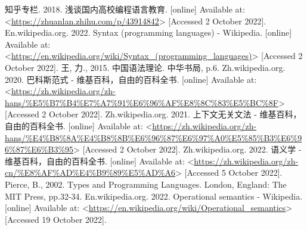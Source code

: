 \documentclass[../main.tex]{subfiles}
\begin{document}
  \begin{thebibliography}{8}
     知乎专栏. 2018. 浅谈国内高校编程语言教育. [online] Available at: <\url{https://zhuanlan.zhihu.com/p/43914842}> [Accessed 2 October 2022].
     En.wikipedia.org. 2022. Syntax (programming languages) - Wikipedia. [online] Available at: <\url{https://en.wikipedia.org/wiki/Syntax_(programming_languages)}> [Accessed 2 October 2022].
     王, 力., 2015. 中国语法理论. 中华书局, p.6.
     Zh.wikipedia.org. 2020. 巴科斯范式 - 维基百科，自由的百科全书. [online] Available at: <\url{https://zh.wikipedia.org/zh-hans/%E5%B7%B4%E7%A7%91%E6%96%AF%E8%8C%83%E5%BC%8F}> [Accessed 2 October 2022]. 
     Zh.wikipedia.org. 2021. 上下文无关文法 - 维基百科，自由的百科全书. [online] Available at: <\url{https://zh.wikipedia.org/zh-hans/%E4%B8%8A%E4%B8%8B%E6%96%87%E6%97%A0%E5%85%B3%E6%96%87%E6%B3%95}> [Accessed 2 October 2022].
     Zh.wikipedia.org. 2022. 语义学 - 维基百科，自由的百科全书. [online] Available at: <\url{https://zh.wikipedia.org/zh-cn/%E8%AF%AD%E4%B9%89%E5%AD%A6}> [Accessed 5 October 2022].
     Pierce, B., 2002. Types and Programming Languages. London, England: The MIT Press, pp.32-34.
     En.wikipedia.org. 2022. Operational semantics - Wikipedia. [online] Available at: <\url{https://en.wikipedia.org/wiki/Operational_semantics}> [Accessed 19 October 2022].
  \end{thebibliography}
\end{document}
